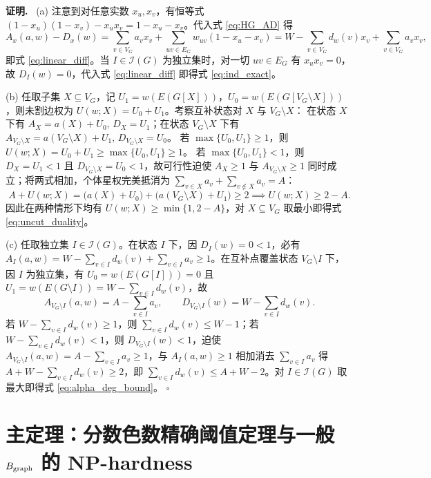 \documentclass[11pt,a4paper]{ctexart}
\theoremstyle{definition}
\newenvironment{proofcn}{\par\noindent\textbf{证明.}\ }{\hfill$\square$\par}
\newcommand{\Ind}{\mathcal I}
\newcommand{\1}{\boldsymbol 1}
\newcommand{\0}{\boldsymbol 0}
\begin{document}
\begin{proofcn}
(a) 注意到对任意实数 $x_u,x_v$，有恒等式 $(1-x_u)(1-x_v)-x_u x_v = 1 - x_u - x_v$。代入式 \eqref{eq:HG_AD} 得
\[
 A_x(a,w)-D_x(w) = \sum_{v\in V_G}a_v x_v + \sum_{uv\in E_G}w_{uv}(1-x_u-x_v)
 = W - \sum_{v\in V_G}d_w(v)x_v + \sum_{v\in V_G}a_v x_v,
\]
即式 \eqref{eq:linear_diff}。当 $I\in\Ind(G)$ 为独立集时，对一切 $uv\in E_G$ 有 $x_u x_v=0$，故 $D_I(w)=0$，代入式 \eqref{eq:linear_diff} 即得式 \eqref{eq:ind_exact}。

(b) 任取子集 $X\subseteq V_G$，记 $U_1=w(E(G[X]))$，$U_0=w(E(G[V_G\setminus X]))$，则未割边权为 $U(w;X)=U_0+U_1$。考察互补状态对 $X$ 与 $V_G\setminus X$：
在状态 $X$ 下有 $A_X=a(X)+U_0,\, D_X=U_1$；在状态 $V_G\setminus X$ 下有 $A_{V_G\setminus X}=a(V_G\setminus X)+U_1,\, D_{V_G\setminus X}=U_0$。
若 $\max\{U_0,U_1\}\ge 1$，则 $U(w;X)=U_0+U_1\ge\max\{U_0,U_1\}\ge 1$。
若 $\max\{U_0,U_1\}<1$，则 $D_X=U_1<1$ 且 $D_{V_G\setminus X}=U_0<1$，故可行性迫使 $A_X\ge 1$ 与 $A_{V_G\setminus X}\ge 1$ 同时成立；将两式相加，个体星权完美抵消为 $\sum_{v\in X}a_v+\sum_{v\notin X}a_v=A$：
\[
 A + U(w;X) = \bigl(a(X)+U_0\bigr) + \bigl(a(V_G\setminus X)+U_1\bigr) \ge 2 \implies U(w;X)\ge 2-A.
\]
因此在两种情形下均有 $U(w;X)\ge\min\{1,2-A\}$，对 $X\subseteq V_G$ 取最小即得式 \eqref{eq:uncut_duality}。

(c) 任取独立集 $I\in\Ind(G)$。在状态 $I$ 下，因 $D_I(w)=0<1$，必有 $A_I(a,w)=W-\sum_{v\in I}d_w(v)+\sum_{v\in I}a_v\ge 1$。在互补点覆盖状态 $V_G\setminus I$ 下，因 $I$ 为独立集，有 $U_0=w(E(G[I]))=0$ 且 $U_1=w(E(G\setminus I))=W-\sum_{v\in I}d_w(v)$，故
\[
 A_{V_G\setminus I}(a,w)=A-\sum_{v\in I}a_v,\qquad D_{V_G\setminus I}(w)=W-\sum_{v\in I}d_w(v).
\]
若 $W-\sum_{v\in I}d_w(v)\ge 1$，则 $\sum_{v\in I}d_w(v)\le W-1$；若 $W-\sum_{v\in I}d_w(v)<1$，则 $D_{V_G\setminus I}(w)<1$，迫使 $A_{V_G\setminus I}(a,w)=A-\sum_{v\in I}a_v\ge 1$，与 $A_I(a,w)\ge 1$ 相加消去 $\sum_{v\in I}a_v$ 得 $A+W-\sum_{v\in I}d_w(v)\ge 2$，即 $\sum_{v\in I}d_w(v)\le A+W-2$。对 $I\in\Ind(G)$ 取最大即得式 \eqref{eq:alpha_deg_bound}。
\end{proofcn}

\section{主定理：分数色数精确阈值定理与一般 $B_{\rm graph}$ 的 NP-hardness}
\end{document}
